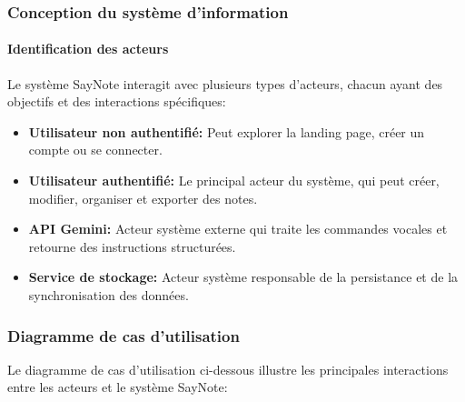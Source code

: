     \subsubsection{Conception du système d'information}
    
    \paragraph{Identification des acteurs}
    
    Le système SayNote interagit avec plusieurs types d'acteurs, chacun ayant des objectifs et des interactions spécifiques:
    
    \begin{itemize}
        \item \textbf{Utilisateur non authentifié:} Peut explorer la landing page, créer un compte ou se connecter.
        
        \item \textbf{Utilisateur authentifié:} Le principal acteur du système, qui peut créer, modifier, organiser et exporter des notes.
        
        \item \textbf{API Gemini:} Acteur système externe qui traite les commandes vocales et retourne des instructions structurées.
        
        \item \textbf{Service de stockage:} Acteur système responsable de la persistance et de la synchronisation des données.
    \end{itemize}
    
    \subsubsection{Diagramme de cas d'utilisation}
    
    Le diagramme de cas d'utilisation ci-dessous illustre les principales interactions entre les acteurs et le système SayNote:
    
